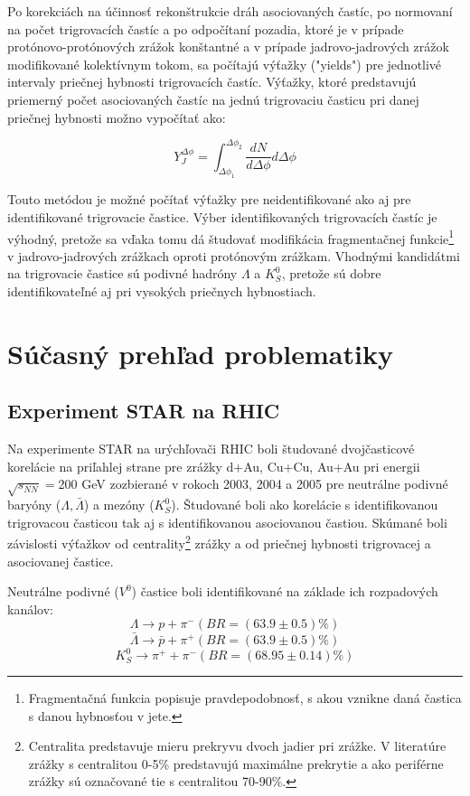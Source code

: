 \documentclass[thesismargins, thesislinespacing]{rnthesis}
\begin{document}
Po korekciách na účinnosť rekonštrukcie dráh asociovaných častíc, po normovaní na počet trigrovacích častíc a po odpočítaní pozadia, ktoré je v prípade protónovo-protónových zrážok konštantné a v prípade jadrovo-jadrových zrážok modifikované kolektívnym tokom, sa počítajú výťažky ("yields") pre jednotlivé intervaly priečnej hybnosti trigrovacích častíc. Výťažky, ktoré predstavujú priemerný počet asociovaných častíc na jednú trigrovaciu časticu pri danej priečnej hybnosti možno vypočítať ako:

\begin{equation}
Y_J^{\Delta\phi}=\int_{\Delta \phi_1}^{\Delta \phi_2} \frac{dN}{d\Delta \phi } d\Delta\phi 
\label{yield}
\end{equation} 

Touto metódou je možné počítať výťažky pre neidentifikované ako aj pre identifikované trigrovacie častice. Výber identifikovaných trigrovacích častíc je výhodný, pretože sa vďaka tomu dá študovať modifikácia fragmentačnej funkcie\footnote{Fragmentačná funkcia popisuje pravdepodobnosť, s akou vznikne daná častica s danou hybnosťou v jete.} v jadrovo-jadrových zrážkach oproti protónovým zrážkam. Vhodnými kandidátmi na trigrovacie častice sú podivné hadróny $\Lambda$ a $K^0_S$, pretože sú dobre identifikovateľné aj pri vysokých priečnych hybnostiach. 

\section{Súčasný prehľad problematiky}
\subsection{Experiment STAR na RHIC}
Na experimente STAR na urýchľovači RHIC boli študované dvojčasticové korelácie na priľahlej strane pre zrážky d+Au, Cu+Cu, Au+Au pri energii $\sqrt{s_{NN}}=$200 GeV zozbierané v rokoch 2003, 2004 a 2005 pre neutrálne podivné baryóny ($\Lambda , \bar{\Lambda}$) a mezóny ($K^0_S$). Študované boli ako korelácie s identifikovanou trigrovacou časticou tak aj s identifikovanou asociovanou častiou. Skúmané boli závislosti výťažkov od centrality\footnote{Centralita predstavuje mieru prekryvu dvoch jadier pri zrážke. V literatúre zrážky s centralitou 0-5\% predstavujú maximálne prekrytie a ako periférne zrážky sú označované tie s centralitou 70-90\%.} zrážky a od priečnej hybnosti trigrovacej a asociovanej častice.

Neutrálne podivné ($V^0$) častice boli identifikované na základe ich rozpadových kanálov:
\begin{equation}
\Lambda \rightarrow p + \pi^{-}  (BR=(63.9 \pm 0.5)\%)
\end{equation}
\begin{equation}
\bar{\Lambda} \rightarrow \bar{p} + \pi^{+}  (BR=(63.9 \pm 0.5)\%)
\end{equation}
\begin{equation}
K^0_S \rightarrow \pi^{+} + \pi^{-}  (BR=(68.95 \pm 0.14)\%)
\end{equation}
\end{document}
